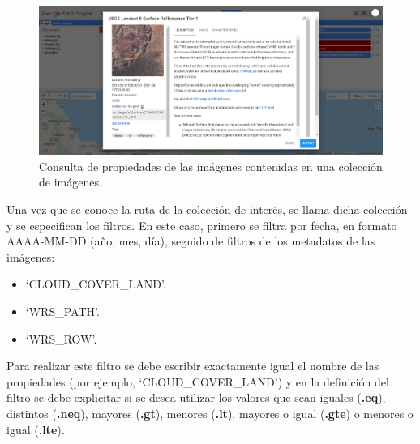\documentclass[
  12pt,
  letterpaper,
  twoside]{book}
\providecommand{\tightlist}{%
  \setlength{\itemsep}{0pt}\setlength{\parskip}{0pt}}
\newcommand\boldpurple[1]{\textcolor{darkpurple}{\textbf{#1}}}
\begin{document}
\begin{figure}[H]

{\centering \includegraphics[width=0.95\linewidth]{Img/Ruta_coleccion} 

}

\caption{Consulta de propiedades de las imágenes contenidas en una colección de imágenes.}\label{fig:f1014}
\end{figure}

Una vez que se conoce la ruta de la colección de interés, se llama dicha colección y se especifican los filtros. En este caso, primero se filtra por fecha, en formato AAAA-MM-DD (año, mes, día), seguido de filtros de los metadatos de las imágenes:

\begin{itemize}
\tightlist
\item
  `CLOUD\_COVER\_LAND'.
\item
  `WRS\_PATH'.
\item
  `WRS\_ROW'.
\end{itemize}

Para realizar este filtro se debe escribir exactamente igual el nombre de las propiedades (por ejemplo, `CLOUD\_COVER\_LAND') y en la definición del filtro se debe explicitar si se desea utilizar los valores que sean iguales (\boldpurple{.eq}), distintos (\boldpurple{.neq}), mayores (\boldpurple{.gt}), menores (\boldpurple{.lt}), mayores o igual (\boldpurple{.gte}) o menores o igual (\boldpurple{.lte}).
\end{document}

